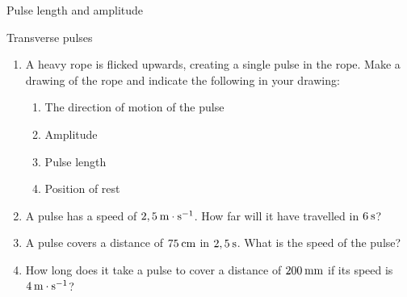 \begin{Investigation}{Pulse length and amplitude }
\begin{eocexercises}{Transverse pulses}
            \nopagebreak
      \label{m38802*id316647}\begin{enumerate}[noitemsep, label=\textbf{\arabic*}. ] 
            \label{m38802*uid66}\item A heavy rope is flicked upwards, creating a single pulse in the rope. Make a drawing of the rope and indicate the following in your drawing:
\label{m38802*id316663}\begin{enumerate}[noitemsep, label=\textbf{\alph*}. ] 
            \label{m38802*uid67}\item The direction of motion of the pulse
\label{m38802*uid68}\item Amplitude
\label{m38802*uid69}\item Pulse length
\label{m38802*uid70}\item Position of rest
\end{enumerate}
                \label{m38802*uid71}\item A pulse has a speed of $2,5\phantom{\rule{2pt}{0ex}}\text{m}\ensuremath{\cdot}\text{s}{}^{-1}$. How far will it have travelled in $6\phantom{\rule{2pt}{0ex}}\text{s}$?\newline
\label{m38802*uid72}\item A pulse covers a distance of $75\phantom{\rule{2pt}{0ex}}\text{cm}$ in $2,5\phantom{\rule{2pt}{0ex}}\text{s}$. What is the speed of the pulse?\newline
\label{m38802*uid73}\item How long does it take a pulse to cover a distance of $200\phantom{\rule{2pt}{0ex}}\text{mm}$ if its speed is $4\phantom{\rule{2pt}{0ex}}\text{m}\ensuremath{\cdot}\text{s}{}^{-1}$?\newline

\end{enumerate}
\end{eocexercises}
\end{Investigation}
